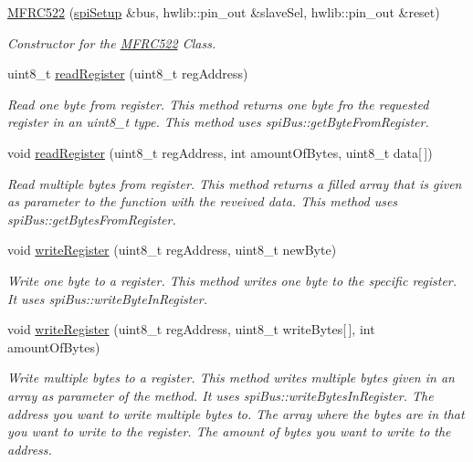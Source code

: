 \begin{DoxyCompactItemize}
\item 
\hyperlink{classMFRC522_a941f62373024077506c43cc67e73f6ae}{M\+F\+R\+C522} (\hyperlink{classspiSetup}{spi\+Setup} \&bus, hwlib\+::pin\+\_\+out \&slave\+Sel, hwlib\+::pin\+\_\+out \&reset)
\begin{DoxyCompactList}\small\item\em Constructor for the \hyperlink{classMFRC522}{M\+F\+R\+C522} Class. \end{DoxyCompactList}\item 
uint8\+\_\+t \hyperlink{classMFRC522_acf84c1c99926ebeffb31480c12492b31}{read\+Register} (uint8\+\_\+t reg\+Address)
\begin{DoxyCompactList}\small\item\em Read one byte from register.  This method returns one byte fro the requested register in an uint8\+\_\+t type. This method uses spi\+Bus\+::get\+Byte\+From\+Register. \end{DoxyCompactList}\item 
void \hyperlink{classMFRC522_a8c8646d903f327c46f544f65e873f2eb}{read\+Register} (uint8\+\_\+t reg\+Address, int amount\+Of\+Bytes, uint8\+\_\+t data\mbox{[}$\,$\mbox{]})
\begin{DoxyCompactList}\small\item\em Read multiple bytes from register.  This method returns a filled array that is given as parameter to the function with the reveived data. This method uses spi\+Bus\+::get\+Bytes\+From\+Register. \end{DoxyCompactList}\item 
void \hyperlink{classMFRC522_a4998d808c32388f57089b5b1f6affea5}{write\+Register} (uint8\+\_\+t reg\+Address, uint8\+\_\+t new\+Byte)
\begin{DoxyCompactList}\small\item\em Write one byte to a register.  This method writes one byte to the specific register. It uses spi\+Bus\+::write\+Byte\+In\+Register. \end{DoxyCompactList}\item 
\mbox{\label{classMFRC522_a302848dc6302753cf8a188b1f3c28ce1}} 
void \hyperlink{classMFRC522_a302848dc6302753cf8a188b1f3c28ce1}{write\+Register} (uint8\+\_\+t reg\+Address, uint8\+\_\+t write\+Bytes\mbox{[}$\,$\mbox{]}, int amount\+Of\+Bytes)
\begin{DoxyCompactList}\small\item\em Write multiple bytes to a register.  This method writes multiple bytes given in an array as parameter of the method. It uses spi\+Bus\+::write\+Bytes\+In\+Register.  The address you want to write multiple bytes to.  The array where the bytes are in that you want to write to the register.  The amount of bytes you want to write to the address. \end{DoxyCompactList}\item 

\end{DoxyCompactItemize}
